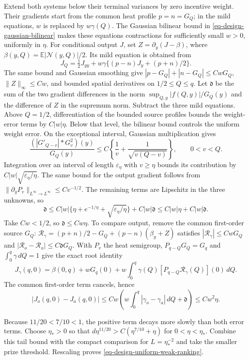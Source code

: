 \documentclass[mnsc]{informs3}
\begin{document}
\begin{APPENDICES}
{Extend both systems below their terminal variances by zero incentive
weight. Their gradients start from the common heat profile $p=n=G_Q$;
in the mild equations, $w$ is replaced by $w\gamma(Q)$.
The Gaussian bilinear bound in
\eqref{eq-design-gaussian-bilinear} makes these equations contractions
for sufficiently small $w>0$, uniformly in $\eta$.
For conditional output $J$, set $Z=\partial_y(J-\beta)$, where
$\beta(y,Q)=\mathbb E|\mathcal N(y,Q)|/2$.
Its mild equation is obtained from
\[
J_Q=\tfrac12J_{yy}+w\gamma\{(p-n)J_y+(p+n)/2\}.
\]
The same bound and Gaussian smoothing give
$|p-G_Q|+|n-G_Q|\leq CwG_Q$, $\|Z\|_\infty\leq Cw$,
and bounded spatial derivatives on $1/2\leq Q\leq q$.
Let $\mathfrak d$ be the sum of the two gradient differences in the norm
$\sup_{Q,y}|f(Q,y)|/G_Q(y)$ and the difference of $Z$ in the supremum norm.
Subtract the three mild equations. Above $Q=1/2$, differentiation of
the bounded source profiles bounds the weight-error terms by $C|w|\eta$.
Below that level, the bilinear bound controls the uniform weight error.
On the exceptional interval, Gaussian multiplication gives
\[
\frac{(|G'_{Q-v}|*G_v^2)(y)}{G_Q(y)}
\leq C\left\{\frac1v+\frac1{\sqrt{v(Q-v)}}\right\},\qquad 0<v<Q.
\]
Integration over an interval of length $\varepsilon_\eta$ with $v\geq\eta$
bounds its contribution by $C|w|\sqrt{\varepsilon_\eta/\eta}$.
The same bound for the output gradient follows from
$\|\partial_yP_v\|_{L^\infty\to L^\infty}\leq Cv^{-1/2}$.
The remaining terms are Lipschitz in the three unknowns, so
\[
\mathfrak d\leq C|w|\{\eta+e^{-1/\eta}+\sqrt{\varepsilon_\eta/\eta}\}
+C|w|\mathfrak d\leq C|w|\eta+C|w|\mathfrak d.
\]
Take $Cw<1/2$, so $\mathfrak d\leq Cw\eta$.
To compare output, remove the common first-order source $G_Q$:
$\mathcal R_\gamma=(p+n)/2-G_Q+(p-n)(\beta_y+Z)$ satisfies
$|\mathcal R_\gamma|\leq CwG_Q$ and
$|\mathcal R_o-\mathcal R_a|\leq C\mathfrak dG_Q$.
With $P_v$ the heat semigroup, $P_{q-Q}G_Q=G_q$ and
$\int_0^q\gamma\,dQ=1$ give the exact root identity
\[
J_\gamma(q,0)=\beta(0,q)+wG_q(0)
+w\int_0^q\gamma(Q)[P_{q-Q}\mathcal R_\gamma(Q)](0)\,dQ.
\]
The common first-order term cancels, hence
\[
|J_o(q,0)-J_a(q,0)|
\leq Cw\left(w\int_0^q|\gamma_o-\gamma_a|\,dQ+\mathfrak d\right)
\leq Cw^2\eta.
\]

Because $11/20<7/10<1$, the positive term decays more slowly than both
error terms. Choose $\eta_*>0$ so that
$d\eta^{11/20}>C(\eta^{7/10}+\eta)$ for $0<\eta<\eta_*$.
Combine this tail bound with the compact comparison for
$L=\eta_*^{-2}$ and take the smaller prize threshold.
Rescaling proves \eqref{eq-design-uniform-weak-ranking}.
\Halmos
\endproof

}
\end{APPENDICES}
\end{document}
